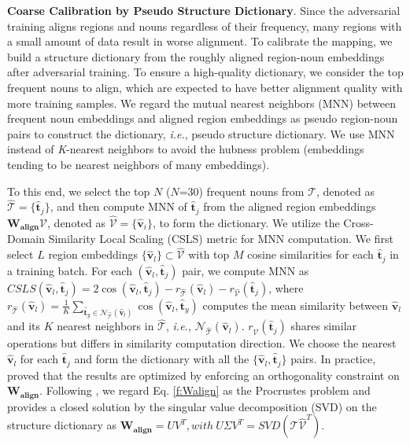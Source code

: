 \documentclass[letterpaper]{article} \usepackage{aaai24}  \usepackage{times}  \usepackage{helvet}  \usepackage{courier}  \usepackage[hyphens]{url}  \usepackage{graphicx} \urlstyle{rm} \def\UrlFont{\rm}  \usepackage{natbib}  \usepackage{caption} \frenchspacing  \setlength{\pdfpagewidth}{8.5in}  \setlength{\pdfpageheight}{11in}
\begin{document}
\noindent\textbf{Coarse Calibration by Pseudo Structure Dictionary}. Since the adversarial training aligns regions and nouns regardless of their frequency, many regions with a small amount of data result in worse alignment. To calibrate the mapping, we build a structure dictionary from the roughly aligned region-noun embeddings after adversarial training. To ensure a high-quality dictionary, we consider the top frequent nouns to align, which are expected to have better alignment quality with more training samples. We regard the mutual nearest neighbors (MNN) \cite{lample2018word} between frequent noun embeddings and aligned region embeddings as pseudo region-noun pairs to construct the dictionary, \textit{i.e.}, pseudo structure dictionary. We use MNN instead of \textit{K}-nearest neighbors to avoid the hubness problem \cite{2014arXiv1412.6568D} (embeddings tending to be nearest neighbors of many embeddings).

To this end, we select the top $N$ ($N$=30) frequent nouns from $\mathcal{T}$, denoted as $\hat{\mathcal{T}}=\{\boldsymbol{\hat{t}}_j\}$, and then compute MNN of $\boldsymbol{\hat{t}}_j$ from the aligned region embeddings $\boldsymbol{W_{{align}}}\mathcal{V}$, denoted as $\hat{\mathcal{V}}=\{\boldsymbol{\hat{v}}_i\}$, to form the dictionary.  We utilize the Cross-Domain Similarity Local Scaling (CSLS) metric \cite{lample2018word} for MNN computation. We first select $L$ region embeddings $\{\boldsymbol{\hat{v}}_l\}\subset\hat{\mathcal{V}}$ with top $M$ cosine similarities for each $\boldsymbol{\hat{t}}_j$ in a training batch. For each $(\boldsymbol{\hat{v}}_l, \boldsymbol{\hat{t}}_j)$ pair, we compute MNN as $CSLS(\boldsymbol{\hat{v}}_l, \boldsymbol{\hat{t}}_j)=2\cos(\boldsymbol{\hat{v}}_l, \boldsymbol{\hat{t}}_j) - r_{\hat{\mathcal{T}}}(\boldsymbol{\hat{v}}_l)-r_{\hat{\mathcal{V}}}(\boldsymbol{\hat{t}}_j)$, where $r_{\mathcal{\hat{T}}}\left(\boldsymbol{\hat{v}}_l\right)=\frac{1}{K} \sum_{\boldsymbol{\hat{t}}_y \in \mathcal{N}_{\mathcal{\hat{T}}}\left(\boldsymbol{\hat{v}}_l\right)} \cos \left(\boldsymbol{\hat{v}}_l, \boldsymbol{\hat{t}}_y\right)$ computes the mean similarity between $\boldsymbol{\hat{v}}_l$ and its $K$ nearest neighbors in $\mathcal{\hat{T}}$, \textit{i.e.},  $\mathcal{N}_{\mathcal{\hat{T}}}\left(\boldsymbol{\hat{v}}_l\right)$. $r_{\hat{\mathcal{V}}}(\boldsymbol{\hat{t}}_j)$ shares similar operations but differs in similarity computation direction. We choose the nearest $\boldsymbol{\hat{v}}_l$ for each $\boldsymbol{\hat{t}}_j$ and form the dictionary with all the $\{\boldsymbol{\hat{v}}_l, \boldsymbol{\hat{t}}_j\}$ pairs. In practice, \cite{xing2015normalized} proved that the results are optimized by enforcing an orthogonality constraint on $\boldsymbol{W_{{align}}}$. Following \cite{xing2015normalized}, we regard Eq. \ref{f:Walign} as the Procrustes problem and provides a closed solution by the singular value decomposition (SVD) on the structure dictionary as $\boldsymbol{W_{align}} = UV^T, with\ U\Sigma{V^T}=SV\!D(\hat{\mathcal{T}}\hat{\mathcal{V}}^T)$.
\end{document}
